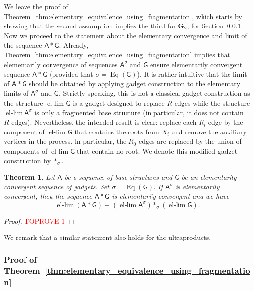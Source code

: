 \documentclass[11pt]{article}
\theoremstyle{plain}
\newtheorem{theorem}{Theorem}[section]
\theoremstyle{definition}
\theoremstyle{remark}
\DeclareMathOperator\Eq{Eq}
\newcommand{\str}[1]{\mathbf{#1}}
\newcommand{\strseq}[1]{{\boldsymbol{\mathsf{#1}}}}
\DeclareMathOperator{\ellim}{el-lim}
\begin{document}
We leave the proof of Theorem~\ref{thm:elementary_equivalence_using_fragmentation}, which starts by showing that the second assumption implies the third for $\str{G}_2$, for Section~\ref{sssec:proof_of_fragmentation}.
Now we proceed to the statement about the elementary convergence and limit of the sequence $\strseq{A} * \strseq{G}$.
Already, Theorem~\ref{thm:elementary_equivalence_using_fragmentation} implies that elementarily convergence of sequences $\strseq{A}^\sigma$ and $\strseq{G}$ ensure elementarily convergent sequence $\strseq{A}*\strseq{G}$ (provided that $\sigma = \Eq(\strseq{G})$).
It is rather intuitive that the limit of $\strseq{A}*\strseq{G}$ should be obtained by applying gadget construction to the elementary limits of $\strseq{A}^\sigma$ and $\strseq{G}$.
Strictly speaking, this is not a classical gadget construction as the structure $\ellim \strseq{G}$ is a gadget designed to replace $R$-edges while the structure $\ellim \strseq{A}^\sigma$ is only a fragmented base structure (in particular, it does not contain $R$-edges).
Nevertheless, the intended result is clear: replace each $R_i$-edge by the component of $\ellim \strseq{G}$ that contains the roots from $X_i$ and remove the auxiliary vertices in the process.
In particular, the $R_0$-edges are replaced by the union of components of $\ellim \strseq{G}$ that contain no root.
We denote this modified gadget construction by $*_\sigma$.

\begin{theorem}\label{thm:preservation_of_elementary_convergence_with_fragmentation}
    Let $\strseq{A}$ be a sequence of base structures and $\strseq{G}$ be an elementarily convergent sequence of gadgets.
    Set $\sigma = \Eq(\strseq{G})$.
    If $\strseq{A}^\sigma$ is elementarily convergent, then the sequence $\strseq{A} * \strseq{G}$ is elementarily convergent and we have
    \[
        \ellim (\strseq{A}*\strseq{G}) \equiv (\ellim \strseq{A}^\sigma) *_\sigma (\ellim \strseq{G})
        .
    \]
\end{theorem}
\begin{proof}\textcolor{red}{TOPROVE 1}\end{proof}

We remark that a similar statement also holds for the ultraproducts.

\subsubsection{Proof of Theorem~\ref{thm:elementary_equivalence_using_fragmentation}}\label{sssec:proof_of_fragmentation}
\end{document}

